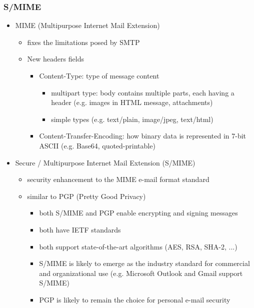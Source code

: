 \documentclass[final]{article}
\begin{document}
\subsubsection*{S/MIME}
\begin{itemize}[nosep]
    \item MIME (Multipurpose Internet Mail Extension)
          \begin{itemize}[nosep]
              \item fixes the limitations posed by SMTP
              \item New headers fields
                    \begin{itemize}[nosep]
                        \item Content-Type: type of message content
                              \begin{itemize}[nosep]
                                  \item multipart type: body contains multiple parts, each having a header (e.g. images in HTML message, attachments)
                                  \item simple types (e.g. text/plain, image/jpeg, text/html)
                              \end{itemize}
                        \item Content-Transfer-Encoding: how binary data is represented in 7-bit ASCII (e.g. Base64, quoted-printable)
                    \end{itemize}
          \end{itemize}
    \item Secure / Multipurpose Internet Mail Extension (S/MIME)
          \begin{itemize}[nosep]
              \item security enhancement to the MIME e-mail format standard
              \item similar to PGP (Pretty Good Privacy)
                    \begin{itemize}[nosep]
                        \item both S/MIME and PGP enable encrypting and signing messages
                        \item both have IETF standards
                        \item both support state-of-the-art algorithms (AES, RSA, SHA-2, ...)
                        \item S/MIME is likely to emerge as the industry standard for commercial and organizational use (e.g. Microsoft Outlook and Gmail support S/MIME)
                        \item PGP is likely to remain the choice for personal e-mail security
                    \end{itemize}
          \end{itemize}
\end{itemize}
\end{document}

